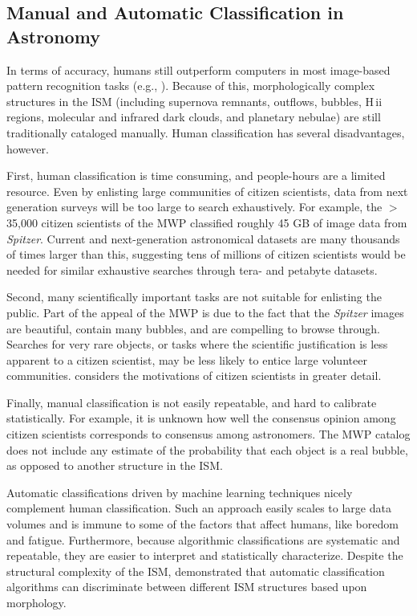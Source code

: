 \documentclass[preprint]{aastex}
\newcommand{\hii}[0]{{\sc H\,ii}}
\begin{document}
\subsection{Manual and Automatic Classification in Astronomy}
\label{sec:benefits}

In terms of accuracy, humans still outperform computers in most image-based pattern recognition tasks (e.g., \citealt{Zhang10}). Because of this, morphologically complex structures in the ISM (including supernova remnants, outflows, bubbles, \hii\, regions, molecular and infrared dark clouds, and planetary nebulae) are still traditionally cataloged manually. Human classification has several disadvantages, however.

First, human classification is time consuming, and people-hours are a limited resource. Even by enlisting large communities of citizen scientists, data from next generation surveys will be too large to search exhaustively. For example, the $>$ 35,000 citizen scientists of the MWP classified roughly 45 GB of image data from \emph{Spitzer}. Current and next-generation astronomical datasets are many thousands of times larger than this, suggesting tens of millions of citizen scientists would be needed for similar exhaustive searches through tera- and petabyte datasets.

Second, many scientifically important tasks are not suitable for enlisting the public. Part of the appeal of the MWP is due to the fact that the \emph{Spitzer} images are beautiful, contain many bubbles, and are compelling to browse through. Searches for very rare objects, or tasks where the scientific justification is less apparent to a citizen scientist, may be less likely to entice large volunteer communities. \cite{Raddick13} considers the motivations of citizen scientists in greater detail.

Finally, manual classification is not easily repeatable, and hard to calibrate statistically. For example, it is unknown how well the consensus opinion among citizen scientists corresponds to consensus among astronomers. The MWP catalog does not include any estimate of the probability that each object is a real bubble, as opposed to another structure in the ISM. 

Automatic classifications driven by machine learning techniques nicely complement human classification. Such an approach easily scales to large data volumes and is immune to some of the factors that affect humans, like boredom and fatigue. Furthermore, because algorithmic classifications are systematic and repeatable, they are easier to interpret and statistically characterize. Despite the structural complexity of the ISM, \cite{Beaumont11} demonstrated that automatic classification algorithms can discriminate between different ISM structures based upon morphology.
\end{document}
